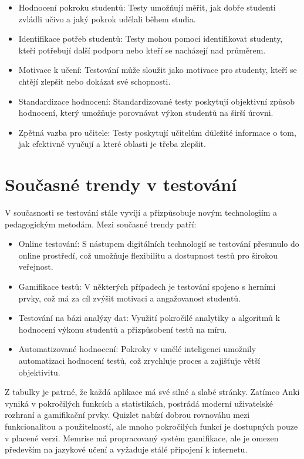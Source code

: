 \documentclass[12pt, a4paper, twoside, openright]{report}
\begin{document}
\begin{itemize}
	\item Hodnocení pokroku studentů: Testy umožňují měřit, jak dobře studenti zvládli učivo a jaký pokrok udělali během studia.
	\item Identifikace potřeb studentů: Testy mohou pomoci identifikovat studenty, kteří potřebují další podporu nebo kteří se nacházejí nad průměrem.
	\item Motivace k učení: Testování může sloužit jako motivace pro studenty, kteří se chtějí zlepšit nebo dokázat své schopnosti.
	\item Standardizace hodnocení: Standardizované testy poskytují objektivní způsob hodnocení, který umožňuje porovnávat výkon studentů na širší úrovni.
	\item Zpětná vazba pro učitele: Testy poskytují učitelům důležité informace o tom, jak efektivně vyučují a které oblasti je třeba zlepšit.
\end{itemize}

\section{Současné trendy v testování}
V současnosti se testování stále vyvíjí a přizpůsobuje novým technologiím a pedagogickým metodám. Mezi současné trendy patří:

\begin{itemize}
	\item Online testování: S nástupem digitálních technologií se testování přesunulo do online prostředí, což umožňuje flexibilitu a dostupnost testů pro širokou veřejnost.
	\item Gamifikace testů: V některých případech je testování spojeno s herními prvky, což má za cíl zvýšit motivaci a angažovanost studentů.
	\item Testování na bázi analýzy dat: Využití pokročilé analytiky a algoritmů k hodnocení výkonu studentů a přizpůsobení testů na míru.
	\item Automatizované hodnocení: Pokroky v umělé inteligenci umožnily automatizaci hodnocení testů, což zrychluje proces a zajišťuje větší objektivitu.
\end{itemize}


	Z tabulky je patrné, že každá aplikace má své silné a slabé stránky. Zatímco Anki vyniká v pokročilých funkcích a statistikách, postrádá moderní uživatelské rozhraní a gamifikační prvky. Quizlet nabízí dobrou rovnováhu mezi funkcionalitou a použitelností, ale mnoho pokročilých funkcí je dostupných pouze v placené verzi. Memrise má propracovaný systém gamifikace, ale je omezen především na jazykové učení a vyžaduje stálé připojení k internetu.
\end{document}
